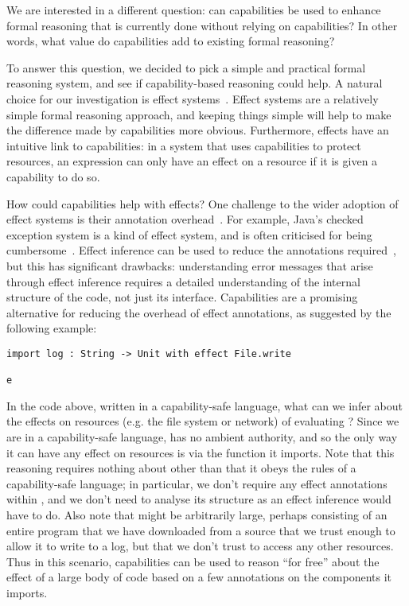 We are interested in a different question: can capabilities be used to enhance formal reasoning that is currently done without relying on capabilities?
In other words, what value do capabilities add to existing formal reasoning?

To answer this question, we decided to pick a simple and practical formal reasoning system, and see if capability-based reasoning could help.
A natural choice for our investigation is effect systems~\cite{nielson99}.
Effect systems are a relatively simple formal reasoning approach, and keeping things simple will help to make the difference made by capabilities more obvious.
Furthermore, effects have an intuitive link to capabilities: in a system that uses capabilities to protect resources, an expression can only have an effect on a resource if it is given a capability to do so.

How could capabilities help with effects?
One challenge to the wider adoption of effect systems is their annotation overhead~\cite{rytz12}.
For example, Java's checked exception system is a kind of effect system, and is often criticised for being cumbersome~\cite{Kiniry2006}.
Effect inference can be used to reduce the annotations required~\cite{koka14}, but this has significant drawbacks: understanding error messages that arise through effect inference requires a detailed understanding of the internal structure of the code, not just its interface.
Capabilities are a promising alternative for reducing the overhead of effect annotations, as suggested by the following example:

\begin{lstlisting}
import log : String -> Unit with effect File.write

e
\end{lstlisting}

In the code above, written in a capability-safe language, what can we infer about the effects on resources (e.g. the file system or network) of evaluating ?
Since we are in a capability-safe language,  has no ambient authority, and so the only way it can have any effect on resources is via the  function it imports.
Note that this reasoning requires nothing about  other than that it obeys the rules of a capability-safe language; in particular, we don't require any effect annotations within , and we don't need to analyse its structure as an effect inference would have to do.
Also note that  might be arbitrarily large, perhaps consisting of an entire program that we have downloaded from a source that we trust enough to allow it to write to a log, but that we don't trust to access any other resources.
Thus in this scenario, capabilities can be used to reason ``for free'' about the effect of a large body of code based on a few annotations on the components it imports.

